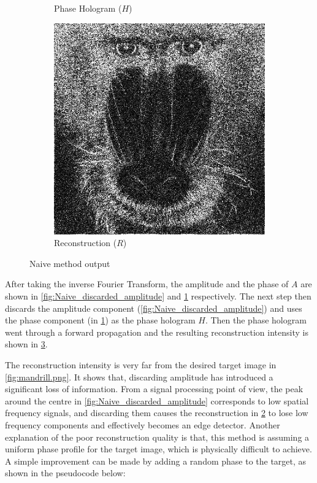 \begin{figure}[H]
\begin{subfigure}[t]{0.3\textwidth}
    \caption{Phase Hologram ($H$)}
    \label{fig:Naive_output_holo}
  \end{subfigure}
  \hfill
  \begin{subfigure}[t]{0.3\textwidth}
    \centering
    \includegraphics[width=\textwidth]{Naive_output_recon.png}
    \caption{Reconstruction ($R$)}
    \label{fig:Naive_output_recon}
  \end{subfigure}
  \caption{Naive method output}
  \label{fig:Naive algorithm output}
\end{figure}

After taking the inverse Fourier Transform, the amplitude and the phase of $A$ are shown in \cref{fig:Naive_discarded_amplitude} and \cref{fig:Naive_output_holo} respectively. The next step then discards the amplitude component (\cref{fig:Naive_discarded_amplitude}) and uses the phase component (in \cref{fig:Naive_output_holo}) as the phase hologram $H$. Then the phase hologram went through a forward propagation and the resulting reconstruction intensity is shown in \cref{fig:Naive algorithm output}.

The reconstruction intensity is very far from the desired target image in \cref{fig:mandrill.png}. It shows that, discarding amplitude has introduced a significant loss of information. From a signal processing point of view, the peak around the centre in \cref{fig:Naive_discarded_amplitude} corresponds to low spatial frequency signals, and discarding them causes the reconstruction in \cref{fig:Naive_output_recon} to lose low frequency components and effectively becomes an edge detector. Another explanation of the poor reconstruction quality is that, this method is assuming a uniform phase profile for the target image, which is physically difficult to achieve. A simple improvement can be made by adding a random phase to the target, as shown in the pseudocode below:

